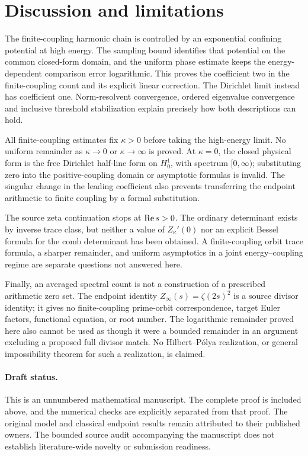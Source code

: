 \section{Discussion and limitations}
\label{sec:discussion}

The finite-coupling harmonic chain is controlled by an
exponential confining potential at high energy.
The sampling bound identifies that potential on the
common closed-form domain, and the uniform phase estimate
keeps the energy-dependent comparison error logarithmic.
This proves the coefficient two in the finite-coupling
count and its explicit linear correction.
The Dirichlet limit instead has coefficient one.
Norm-resolvent convergence, ordered eigenvalue convergence
and inclusive threshold stabilization explain precisely
how both descriptions can hold.

All finite-coupling estimates fix $\kappa>0$ before
taking the high-energy limit.
No uniform remainder as $\kappa\to0$ or
$\kappa\to\infty$ is proved.
At $\kappa=0$, the closed physical form is the free
Dirichlet half-line form on $H^1_0$, with spectrum
$[0,\infty)$; substituting zero into the positive-coupling
domain or asymptotic formulas is invalid.
The singular change in the leading coefficient also
prevents transferring the endpoint arithmetic to finite
coupling by a formal substitution.

The source zeta continuation stops at $\operatorname{Re} s>0$.
The ordinary determinant exists by inverse trace class,
but neither a value of $Z_\kappa'(0)$ nor an explicit
Bessel formula for the comb determinant has been obtained.
A finite-coupling orbit trace formula, a sharper remainder,
and uniform asymptotics in a joint energy--coupling regime
are separate questions not answered here.

Finally, an averaged spectral count is not a construction
of a prescribed arithmetic zero set.
The endpoint identity $Z_\infty(s)=\zeta(2s)^2$
is a source divisor identity; it gives no finite-coupling
prime-orbit correspondence, target Euler factors,
functional equation, or root number.
The logarithmic remainder proved here also cannot be
used as though it were a bounded remainder in an
argument excluding a proposed full divisor match.
No Hilbert--P\'olya realization, or general impossibility
theorem for such a realization, is claimed.

\paragraph{Draft status.}
This is an unnumbered mathematical manuscript.
The complete proof is included above, and the numerical
checks are explicitly separated from that proof.
The original model and classical endpoint results remain
attributed to their published owners.
The bounded source audit accompanying the manuscript
does not establish literature-wide novelty or submission
readiness.
